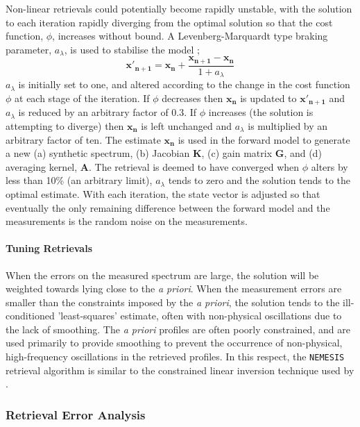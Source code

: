 \documentclass[final,5p,times,twocolumn,authoryear]{elsarticle}
\begin{document}
Non-linear retrievals could potentially become rapidly unstable, with the solution to each iteration rapidly diverging from the optimal solution so that the cost function, $\phi$, increases without bound.  A Levenberg-Marquardt type braking parameter, $a_{\lambda}$, is used to stabilise the model \citep{04irwin};
\begin{equation}
\mathbf{x'_{n+1}}=\mathbf{x_n}+\frac{\mathbf{x_{n+1}-x_{n}}}{1+a_{\lambda}}
\end{equation}
$a_{\lambda}$ is initially set to one, and altered according to the change in the cost function $\phi$ at each stage of the iteration. If $\phi $ decreases then $\mathbf{x_n}$ is updated to $\mathbf{x'_{n+1}}$ and $a_{\lambda }$ is reduced by an arbitrary factor of 0.3. If $\phi $ increases (the solution is attempting to diverge) then $\mathbf{x_n}$ is left unchanged and $a_{\lambda }$ is multiplied by an arbitrary factor of ten.  The estimate $\mathbf{x_n}$ is used in the forward model to generate a new (a) synthetic spectrum, (b) Jacobian $\mathbf{K}$, (c) gain matrix $\mathbf{G}$, and (d) averaging kernel, $\mathbf{A}$.  The retrieval is deemed to have converged when $\phi$ alters by less than 10\% (an arbitrary limit), $a_{\lambda }$ tends to zero and the solution tends to the optimal estimate.  With each iteration, the state vector is adjusted so that eventually the only remaining difference between the forward model and the measurements is the random noise on the measurements.

\paragraph{Tuning Retrievals}

When the errors on the measured spectrum are large, the solution will be weighted towards lying close to the \textit{a priori}.  When the measurement errors are smaller than the constraints imposed by the \textit{a priori}, the solution tends to the ill-conditioned 'least-squares' estimate, often with non-physical oscillations due to the lack of smoothing.  The \textit{a priori} profiles are often poorly constrained, and are used primarily to provide smoothing to prevent the occurrence of non-physical, high-frequency oscillations in the retrieved profiles.  In this respect, the \verb#NEMESIS# retrieval algorithm is similar to the constrained linear inversion technique used by \citet{98conrath}.

\subsubsection{Retrieval Error Analysis}
\end{document}
